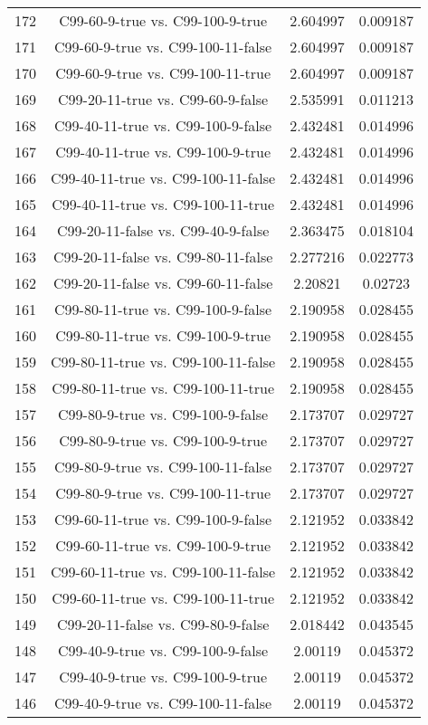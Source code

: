 \documentclass[a4paper,10pt]{article}
\begin{document}
\begin{landscape}
\begin{table}[!htp]
\begin{tabular}{cccc}
172&C99-60-9-true vs. C99-100-9-true&2.604997&0.009187\\
171&C99-60-9-true vs. C99-100-11-false&2.604997&0.009187\\
170&C99-60-9-true vs. C99-100-11-true&2.604997&0.009187\\
169&C99-20-11-true vs. C99-60-9-false&2.535991&0.011213\\
168&C99-40-11-true vs. C99-100-9-false&2.432481&0.014996\\
167&C99-40-11-true vs. C99-100-9-true&2.432481&0.014996\\
166&C99-40-11-true vs. C99-100-11-false&2.432481&0.014996\\
165&C99-40-11-true vs. C99-100-11-true&2.432481&0.014996\\
164&C99-20-11-false vs. C99-40-9-false&2.363475&0.018104\\
163&C99-20-11-false vs. C99-80-11-false&2.277216&0.022773\\
162&C99-20-11-false vs. C99-60-11-false&2.20821&0.02723\\
161&C99-80-11-true vs. C99-100-9-false&2.190958&0.028455\\
160&C99-80-11-true vs. C99-100-9-true&2.190958&0.028455\\
159&C99-80-11-true vs. C99-100-11-false&2.190958&0.028455\\
158&C99-80-11-true vs. C99-100-11-true&2.190958&0.028455\\
157&C99-80-9-true vs. C99-100-9-false&2.173707&0.029727\\
156&C99-80-9-true vs. C99-100-9-true&2.173707&0.029727\\
155&C99-80-9-true vs. C99-100-11-false&2.173707&0.029727\\
154&C99-80-9-true vs. C99-100-11-true&2.173707&0.029727\\
153&C99-60-11-true vs. C99-100-9-false&2.121952&0.033842\\
152&C99-60-11-true vs. C99-100-9-true&2.121952&0.033842\\
151&C99-60-11-true vs. C99-100-11-false&2.121952&0.033842\\
150&C99-60-11-true vs. C99-100-11-true&2.121952&0.033842\\
149&C99-20-11-false vs. C99-80-9-false&2.018442&0.043545\\
148&C99-40-9-true vs. C99-100-9-false&2.00119&0.045372\\
147&C99-40-9-true vs. C99-100-9-true&2.00119&0.045372\\
146&C99-40-9-true vs. C99-100-11-false&2.00119&0.045372\\

\end{tabular}
\end{table}
\end{landscape}
\end{document}

